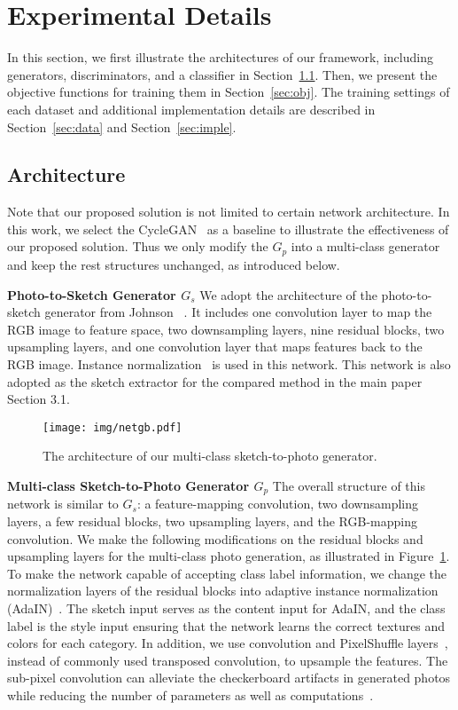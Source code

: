 \documentclass[10pt,twocolumn,letterpaper]{article}
\begin{document}
\section{Experimental Details} 
\label{sec:exp_details}
In this section, we first illustrate the architectures of our framework, including generators, discriminators, and a classifier in Section~\ref{sec:arch}. Then, we present the objective functions for training them in Section~\ref{sec:obj}. The training settings of each dataset and additional implementation details are described in Section~\ref{sec:data} and Section~\ref{sec:imple}.

\subsection{Architecture}
\label{sec:arch}
Note that our proposed solution is not limited to certain network architecture. In this work, we select the CycleGAN~\cite{zhu2017unpaired} as a baseline to illustrate the effectiveness of our proposed solution. Thus we only modify the $G_p$ into a multi-class generator and keep the rest structures unchanged, as introduced below.

\noindent \textbf{Photo-to-Sketch Generator $G_s$}  We adopt the architecture of the photo-to-sketch generator from Johnson \etal~\cite{johnson2016perceptual}. It includes one convolution layer to map the RGB image to feature space, two downsampling layers, nine residual blocks, two upsampling layers, and one convolution layer that maps features back to the RGB image. Instance normalization~\cite{ulyanov2016instance} is used in this network. This network is also adopted as the sketch extractor for the compared method in the main paper Section 3.1.

\begin{figure}[tbp]
    \centering
    \texttt{[image: img/netgb.pdf]}
    \caption{The architecture of our multi-class sketch-to-photo generator.} 
    \label{fig:netGB}
\end{figure}

\noindent \textbf{Multi-class Sketch-to-Photo Generator $G_p$} The overall structure of this network is similar to $G_s$: a feature-mapping convolution, two downsampling layers, a few residual blocks, two upsampling layers, and the RGB-mapping convolution. We make the following modifications on the residual blocks and upsampling layers for the multi-class photo generation, as illustrated in Figure~\ref{fig:netGB}. To make the network capable of accepting class label information, we change the normalization layers of the residual blocks into adaptive instance normalization (AdaIN)~\cite{huang2017arbitrary}. The sketch input serves as the content input for AdaIN, and the class label is the style input ensuring that the network learns the correct textures and colors for each category. In addition, we use convolution and PixelShuffle layers~\cite{shi2016real}, instead of commonly used transposed convolution, to upsample the features. The sub-pixel convolution can alleviate the checkerboard artifacts in generated photos while reducing the number of parameters as well as computations~\cite{aitken2017checkerboard}.
\end{document}
